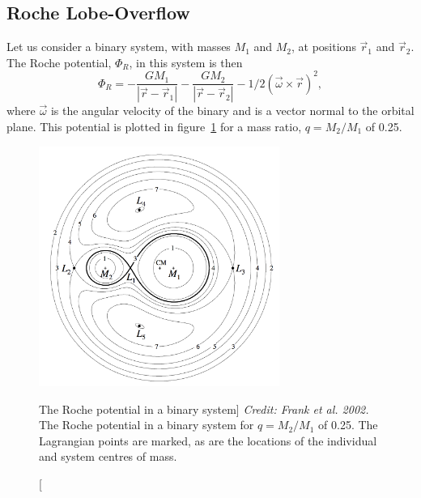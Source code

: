 \subsection{Roche Lobe-Overflow}

Let us consider a binary system, with masses $M_1$ and $M_2$, at positions
$\vec{r}_1$ and $\vec{r}_2$. The Roche potential, $\Phi_R$, in this system 
is then
\begin{equation}
\Phi_R = - \frac{GM_1}{| \vec{r} - \vec{r}_1 |} - 
\frac{GM_2}{| \vec{r} - \vec{r}_2 |} - 1/2 (\vec{\omega} \times
 \vec{r})^2,
\label{eq:roche}
\end{equation} 
where $\vec{\omega}$ is the angular velocity of the binary and is a vector normal to
the orbital plane. This potential is plotted in figure~\ref{fig:roche} for a mass ratio, 
$q = M_2 / M_1$ of 0.25.

\begin{figure}
\centering
\includegraphics[width=0.7\textwidth]{figures/01-intro/roche_potential.png}
\caption
[The Roche potential in a binary system]
{
{\sl Credit: Frank et al. 2002.} 
The Roche potential in a binary system for $q = M_2 / M_1$ of 0.25.
The Lagrangian points are marked, as are the locations of the individual
and system centres of mass.
} 
\label{fig:roche}
\end{figure}

